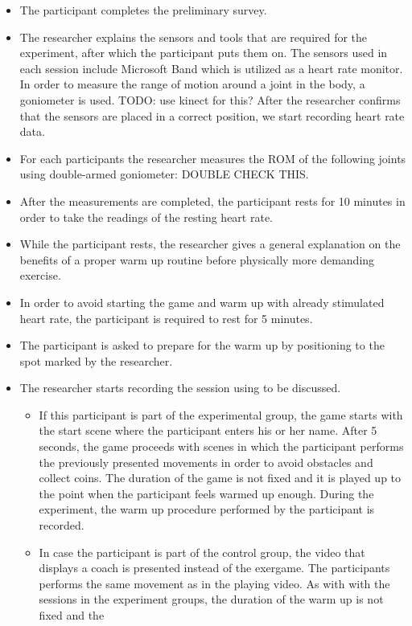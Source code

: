 \begin{itemize}
\item The participant completes the preliminary survey.
\item The researcher explains the sensors and tools that are required for the experiment, after which the participant puts them on. The sensors used in each session include Microsoft Band which is utilized as a heart rate monitor. In order to measure the range of motion around a joint in the body, a goniometer is used. TODO: use kinect for this?%
After the researcher confirms that the sensors are placed in a correct position, we start recording heart rate data. %
\item For each participants the researcher measures the ROM of the following joints using double-armed goniometer: DOUBLE CHECK THIS. %
\item After the measurements are completed, the participant rests for 10 minutes in order to take the readings of the resting heart rate. 
\item While the participant rests, the researcher gives a general explanation on the benefits of a proper warm up routine before physically more demanding exercise.
\item In order to avoid starting the game and warm up with already stimulated heart rate, the participant is required to rest for 5 minutes. 
\item The participant is asked to prepare for the warm up by positioning to the spot marked by the researcher.
\item The researcher starts recording the session using to be discussed.
\begin{itemize}
\item  If this participant is part of the experimental group, the game starts with the start scene where the participant enters his or her name. After 5 seconds, the game proceeds with scenes in which the participant performs the previously presented movements in order to avoid obstacles and collect coins. The duration of the game is not fixed and it is played up to the point when the participant feels warmed up enough. During the experiment, the warm up procedure performed by the participant is recorded. %
\item  In case the participant is part of the control group, the video that displays a coach is presented instead of the exergame. The participants performs the same movement as in the playing video. As with with the sessions in the experiment groups, the duration of the warm up is not fixed and the 

\end{itemize}
\end{itemize}
